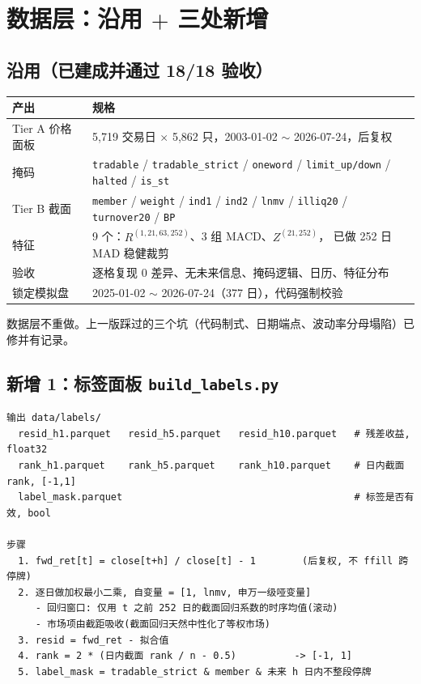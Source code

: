 \documentclass[11pt, a4paper]{ctexart}
\newcommand{\file}[1]{\texttt{\small #1}}
\begin{document}
\section{数据层：沿用 $+$ 三处新增}

\subsection{沿用（已建成并通过 18/18 验收）}

\begin{center}
\small
\begin{tabular}{ll}
\toprule
产出 & 规格 \\
\midrule
Tier A 价格面板 & 5{,}719 交易日 $\times$ 5{,}862 只，2003-01-02 $\sim$ 2026-07-24，后复权 \\
掩码 & \file{tradable} / \file{tradable\_strict} / \file{oneword} / \file{limit\_up/down}
       / \file{halted} / \file{is\_st} \\
Tier B 截面 & \file{member} / \file{weight} / \file{ind1} / \file{ind2} / \file{lnmv}
             / \file{illiq20} / \file{turnover20} / \file{BP} \\
特征 & 9 个：$R^{(1,21,63,252)}$、3 组 MACD、$Z^{(21,252)}$，
       已做 252 日 MAD 稳健裁剪 \\
验收 & 逐格复现 0 差异、无未来信息、掩码逻辑、日历、特征分布 \\
锁定模拟盘 & 2025-01-02 $\sim$ 2026-07-24（377 日），代码强制校验 \\
\bottomrule
\end{tabular}
\end{center}

数据层不重做。上一版踩过的三个坑（代码制式、日期端点、波动率分母塌陷）已修并有记录。

\subsection{新增 1：标签面板 \file{build\_labels.py}}

\begin{lstlisting}
输出 data/labels/
  resid_h1.parquet   resid_h5.parquet   resid_h10.parquet   # 残差收益, float32
  rank_h1.parquet    rank_h5.parquet    rank_h10.parquet    # 日内截面 rank, [-1,1]
  label_mask.parquet                                        # 标签是否有效, bool

步骤
  1. fwd_ret[t] = close[t+h] / close[t] - 1        (后复权, 不 ffill 跨停牌)
  2. 逐日做加权最小二乘, 自变量 = [1, lnmv, 申万一级哑变量]
     - 回归窗口: 仅用 t 之前 252 日的截面回归系数的时序均值(滚动)
     - 市场项由截距吸收(截面回归天然中性化了等权市场)
  3. resid = fwd_ret - 拟合值
  4. rank = 2 * (日内截面 rank / n - 0.5)          -> [-1, 1]
  5. label_mask = tradable_strict & member & 未来 h 日内不整段停牌
\end{lstlisting}
\end{document}
